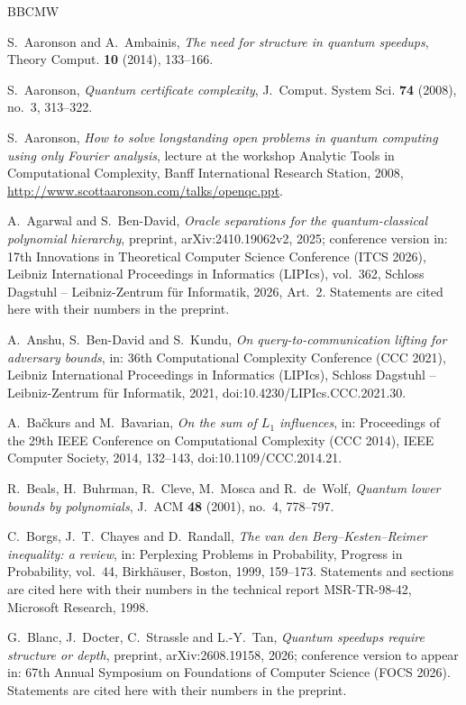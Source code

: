 \documentclass[11pt,reqno]{amsart}
\theoremstyle{definition}
\theoremstyle{remark}
\numberwithin{equation}{section}
\theoremstyle{named}
\theoremstyle{plain}
\begin{document}
\begin{thebibliography}{BBCMW}

 S.~Aaronson and A.~Ambainis, \emph{The need for structure in quantum speedups},
Theory Comput. \textbf{10} (2014), 133--166.

 S.~Aaronson, \emph{Quantum certificate complexity}, J.~Comput. System Sci.
\textbf{74} (2008), no.~3, 313--322.

 S.~Aaronson, \emph{How to solve longstanding open problems in quantum computing
using only Fourier analysis}, lecture at the workshop Analytic Tools in Computational Complexity,
Banff International Research Station, 2008, \url{http://www.scottaaronson.com/talks/openqc.ppt}.

 A.~Agarwal and S.~Ben-David, \emph{Oracle separations for the quantum-classical
polynomial hierarchy}, preprint, arXiv:2410.19062v2, 2025; conference version in: 17th Innovations in
Theoretical Computer Science Conference (ITCS 2026), Leibniz International Proceedings in Informatics
(LIPIcs), vol.~362, Schloss Dagstuhl -- Leibniz-Zentrum f\"ur Informatik, 2026, Art.~2. Statements are
cited here with their numbers in the preprint.

 A.~Anshu, S.~Ben-David and S.~Kundu, \emph{On query-to-communication lifting for
adversary bounds}, in: 36th Computational Complexity Conference (CCC 2021), Leibniz International
Proceedings in Informatics (LIPIcs), Schloss Dagstuhl -- Leibniz-Zentrum f\"ur Informatik, 2021,
doi:10.4230/LIPIcs.CCC.2021.30.

 A.~Ba\v{c}kurs and M.~Bavarian, \emph{On the sum of $L_1$ influences}, in:
Proceedings of the 29th IEEE Conference on Computational Complexity (CCC 2014), IEEE Computer Society,
2014, 132--143, doi:10.1109/CCC.2014.21.

 R.~Beals, H.~Buhrman, R.~Cleve, M.~Mosca and R.~de~Wolf, \emph{Quantum lower
bounds by polynomials}, J.~ACM \textbf{48} (2001), no.~4, 778--797.

 C.~Borgs, J.~T.~Chayes and D.~Randall, \emph{The van den Berg--Kesten--Reimer
inequality: a review}, in: Perplexing Problems in Probability, Progress in Probability, vol.~44,
Birkh\"auser, Boston, 1999, 159--173. Statements and sections are cited here with their numbers in
the technical report MSR-TR-98-42, Microsoft Research, 1998.

 G.~Blanc, J.~Docter, C.~Strassle and L.-Y.~Tan, \emph{Quantum speedups require
structure or depth}, preprint, arXiv:2608.19158, 2026; conference version to appear in: 67th Annual
Symposium on Foundations of Computer Science (FOCS 2026). Statements are cited here with their numbers
in the preprint.


\end{thebibliography}
\end{document}
